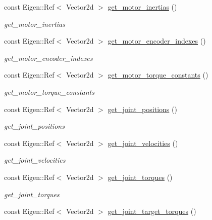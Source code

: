 \begin{DoxyCompactItemize}
const Eigen\+::\+Ref$<$ Vector2d $>$ \hyperlink{classblmc__robots_1_1SingleLeg_a2be0f81bd58416d43614e2c6069ca471}{get\+\_\+motor\+\_\+inertias} ()
\begin{DoxyCompactList}\small\item\em get\+\_\+motor\+\_\+inertias \end{DoxyCompactList}\item 
const Eigen\+::\+Ref$<$ Vector2d $>$ \hyperlink{classblmc__robots_1_1SingleLeg_aec4353d090ed7bd503d43b3e17671ded}{get\+\_\+motor\+\_\+encoder\+\_\+indexes} ()
\begin{DoxyCompactList}\small\item\em get\+\_\+motor\+\_\+encoder\+\_\+indexes \end{DoxyCompactList}\item 
const Eigen\+::\+Ref$<$ Vector2d $>$ \hyperlink{classblmc__robots_1_1SingleLeg_a402a4e609e17fb304a113cb5c434b7e3}{get\+\_\+motor\+\_\+torque\+\_\+constants} ()
\begin{DoxyCompactList}\small\item\em get\+\_\+motor\+\_\+torque\+\_\+constants \end{DoxyCompactList}\item 
const Eigen\+::\+Ref$<$ Vector2d $>$ \hyperlink{classblmc__robots_1_1SingleLeg_ad69364827ba1f041bb45aec9ff678a74}{get\+\_\+joint\+\_\+positions} ()
\begin{DoxyCompactList}\small\item\em get\+\_\+joint\+\_\+positions \end{DoxyCompactList}\item 
const Eigen\+::\+Ref$<$ Vector2d $>$ \hyperlink{classblmc__robots_1_1SingleLeg_aad4d838300a95db9e5e78aa465601591}{get\+\_\+joint\+\_\+velocities} ()
\begin{DoxyCompactList}\small\item\em get\+\_\+joint\+\_\+velocities \end{DoxyCompactList}\item 
const Eigen\+::\+Ref$<$ Vector2d $>$ \hyperlink{classblmc__robots_1_1SingleLeg_adba890cb19a75df119a94d2f3b063ec2}{get\+\_\+joint\+\_\+torques} ()
\begin{DoxyCompactList}\small\item\em get\+\_\+joint\+\_\+torques \end{DoxyCompactList}\item 
const Eigen\+::\+Ref$<$ Vector2d $>$ \hyperlink{classblmc__robots_1_1SingleLeg_ab28eb09362cee1b0eaa1a066d5f4d760}{get\+\_\+joint\+\_\+target\+\_\+torques} ()

\end{DoxyCompactItemize}
